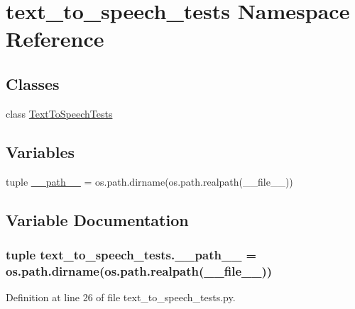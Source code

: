 \hypertarget{namespacetext__to__speech__tests}{\section{text\-\_\-to\-\_\-speech\-\_\-tests Namespace Reference}
\label{namespacetext__to__speech__tests}
}
\subsection*{Classes}
\begin{DoxyCompactItemize}
\item 
class \hyperlink{classtext__to__speech__tests_1_1TextToSpeechTests}{Text\-To\-Speech\-Tests}
\end{DoxyCompactItemize}
\subsection*{Variables}
\begin{DoxyCompactItemize}
\item 
tuple \hyperlink{namespacetext__to__speech__tests_aca436fdd26ef39645b5e9e2f1119490b}{\-\_\-\-\_\-path\-\_\-\-\_\-} = os.\-path.\-dirname(os.\-path.\-realpath(\-\_\-\-\_\-file\-\_\-\-\_\-))
\end{DoxyCompactItemize}


\subsection{Variable Documentation}
\hypertarget{namespacetext__to__speech__tests_aca436fdd26ef39645b5e9e2f1119490b}{
\subsubsection[{\-\_\-\-\_\-path\-\_\-\-\_\-}]{\setlength{\rightskip}{0pt plus 5cm}tuple text\-\_\-to\-\_\-speech\-\_\-tests.\-\_\-\-\_\-path\-\_\-\-\_\- = os.\-path.\-dirname(os.\-path.\-realpath(\-\_\-\-\_\-file\-\_\-\-\_\-))}}\label{namespacetext__to__speech__tests_aca436fdd26ef39645b5e9e2f1119490b}


Definition at line 26 of file text\-\_\-to\-\_\-speech\-\_\-tests.\-py.


